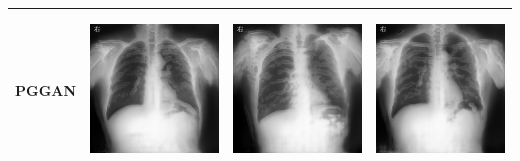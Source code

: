 \begin{table}[H]
\begin{tabularx}{\linewidth}{@{}>{\centering\arraybackslash}m{3cm}>{\centering\arraybackslash}X>{\centering\arraybackslash}X>{\centering\arraybackslash}X@{}}
PGGAN & \includegraphics[valign=M,width=\linewidth,height=4cm,keepaspectratio]{main/content/images/pggan/train_pneumoconiosis/111.png} & \includegraphics[valign=M,width=\linewidth,height=4cm,keepaspectratio]{main/content/images/pggan/train_pneumoconiosis/112.png} & \includegraphics[valign=M,width=\linewidth,height=4cm,keepaspectratio]{main/content/images/pggan/train_pneumoconiosis/113.png} \\
\midrule

\end{tabularx}
\end{table}
